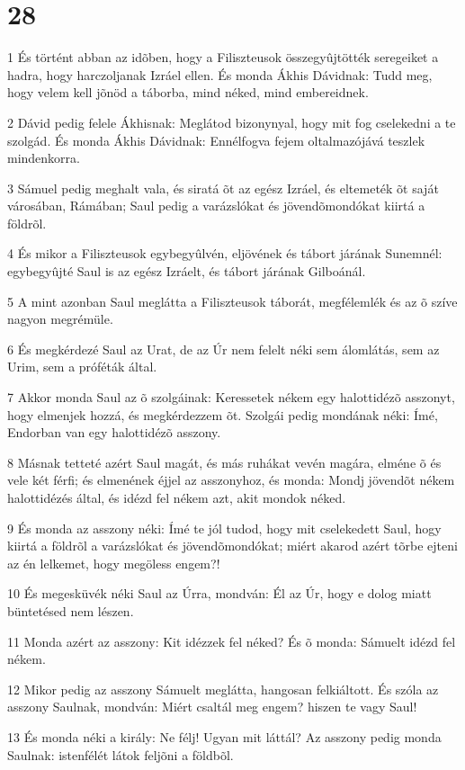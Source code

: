 \chapter{28}

\par 1 És történt abban az idõben, hogy a Filiszteusok összegyûjtötték seregeiket a hadra, hogy harczoljanak Izráel ellen. És monda Ákhis Dávidnak: Tudd meg, hogy velem kell jõnöd a táborba, mind néked, mind embereidnek.
\par 2 Dávid pedig felele Ákhisnak: Meglátod bizonynyal, hogy mit fog cselekedni a te szolgád. És monda Ákhis Dávidnak: Ennélfogva fejem oltalmazójává teszlek mindenkorra.
\par 3 Sámuel pedig meghalt vala, és siratá õt az egész Izráel, és eltemeték õt saját városában, Rámában; Saul pedig a varázslókat és jövendõmondókat kiirtá a földrõl.
\par 4 És mikor a Filiszteusok egybegyûlvén, eljövének és tábort járának Sunemnél: egybegyûjté Saul is az egész Izráelt, és tábort járának Gilboánál.
\par 5 A mint azonban Saul meglátta a Filiszteusok táborát, megfélemlék és az õ szíve nagyon megrémüle.
\par 6 És megkérdezé Saul az Urat, de az Úr nem felelt néki sem álomlátás, sem az Urim,  sem a próféták által.
\par 7 Akkor monda Saul az õ szolgáinak: Keressetek nékem egy halottidézõ asszonyt, hogy elmenjek hozzá, és megkérdezzem õt. Szolgái pedig mondának néki: Ímé, Endorban van egy halottidézõ asszony.
\par 8 Másnak tetteté azért Saul magát, és más ruhákat vevén magára, elméne õ és vele két férfi; és elmenének éjjel az asszonyhoz, és monda: Mondj jövendõt nékem halottidézés által, és idézd fel nékem azt, akit mondok néked.
\par 9 És monda az asszony néki: Ímé te jól tudod, hogy mit cselekedett Saul, hogy kiirtá a földrõl a varázslókat és jövendõmondókat; miért akarod azért tõrbe ejteni az én lelkemet, hogy megöless engem?!
\par 10 És megesküvék néki Saul az Úrra, mondván: Él az Úr, hogy e dolog miatt büntetésed nem lészen.
\par 11 Monda azért az asszony: Kit idézzek fel néked? És õ monda: Sámuelt idézd fel nékem.
\par 12 Mikor pedig az asszony Sámuelt meglátta, hangosan felkiáltott. És szóla az asszony Saulnak, mondván: Miért csaltál meg engem? hiszen te vagy Saul!
\par 13 És monda néki a király: Ne félj! Ugyan mit láttál? Az asszony pedig monda Saulnak: istenfélét látok feljõni a földbõl.
